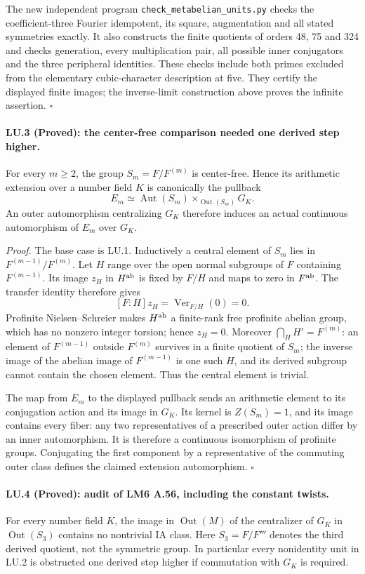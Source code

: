 The new independent program \texttt{check\_metabelian\_units.py}
checks the coefficient-three Fourier idempotent, its square,
augmentation and all stated symmetries exactly. It also constructs
the finite quotients of orders 48, 75 and 324 and checks generation,
every multiplication pair, all possible inner conjugators and the
three peripheral identities. These checks include both primes
excluded from the elementary cubic-character description at five.
They certify the displayed finite images; the inverse-limit
construction above proves the infinite assertion. \hfill$\square$

\paragraph{LU.3 (Proved): the center-free comparison needed one derived step higher.}
For every $m\ge2$, the group $S_m=F/F^{(m)}$ is center-free.
Hence its arithmetic extension over a number field $K$ is
canonically the pullback
\[
 E_m\simeq\operatorname{Aut}(S_m)
             \times_{\operatorname{Out}(S_m)}G_K.
\]
An outer automorphism centralizing $G_K$ therefore induces an
actual continuous automorphism of $E_m$ over $G_K$.

\emph{Proof.}
The base case is LU.1. Inductively a central element of $S_m$
lies in $F^{(m-1)}/F^{(m)}$. Let $H$ range over the open normal
subgroups of $F$ containing $F^{(m-1)}$. Its image $z_H$ in
$H^{\rm ab}$ is fixed by $F/H$ and maps to zero in $F^{\rm ab}$.
The transfer identity therefore gives
\[
 [F:H]z_H=\operatorname{Ver}_{F/H}(0)=0.
\]
Profinite Nielsen--Schreier makes $H^{\rm ab}$ a finite-rank
free profinite abelian group, which has no nonzero integer
torsion; hence $z_H=0$.
Moreover $\bigcap_HH'=F^{(m)}$: an element of $F^{(m-1)}$
outside $F^{(m)}$ survives in a finite quotient of $S_m$;
the inverse image of the abelian image of $F^{(m-1)}$ is one
such $H$, and its derived subgroup cannot contain the chosen
element. Thus the central element is trivial.

The map from $E_m$ to the displayed pullback sends an arithmetic
element to its conjugation action and its image in $G_K$.
Its kernel is $Z(S_m)=1$, and its image contains every fiber:
any two representatives of a prescribed outer action differ by
an inner automorphism. It is therefore a continuous isomorphism
of profinite groups. Conjugating the first component by a
representative of the commuting outer class defines the claimed
extension automorphism. \hfill$\square$

\paragraph{LU.4 (Proved): audit of LM6 A.56, including the constant twists.}
For every number field $K$, the image in $\operatorname{Out}(M)$
of the centralizer of $G_K$ in $\operatorname{Out}(S_3)$ contains
no nontrivial IA class. Here $S_3=F/F'''$ denotes the third
derived quotient, not the symmetric group. In particular every
nonidentity unit in LU.2 is obstructed one derived step higher
if commutation with $G_K$ is required.

